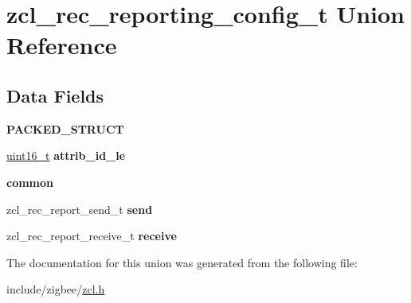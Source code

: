 \hypertarget{unionzcl__rec__reporting__config__t}{}\section{zcl\+\_\+rec\+\_\+reporting\+\_\+config\+\_\+t Union Reference}
\label{unionzcl__rec__reporting__config__t}
\subsection*{Data Fields}
\begin{DoxyCompactItemize}
\item 
{\bfseries P\+A\+C\+K\+E\+D\+\_\+\+S\+T\+R\+U\+CT}
\item 
\hyperlink{group__hal__dos_ga5a8b2dc9e45a9ee81a94ef304fb62505}{uint16\+\_\+t} {\bfseries attrib\+\_\+id\+\_\+le}
\item 
{\bfseries common}
\item 
zcl\+\_\+rec\+\_\+report\+\_\+send\+\_\+t {\bfseries send}
\item 
zcl\+\_\+rec\+\_\+report\+\_\+receive\+\_\+t {\bfseries receive}
\end{DoxyCompactItemize}


The documentation for this union was generated from the following file\+:\begin{DoxyCompactItemize}
\item 
include/zigbee/\hyperlink{zcl_8h}{zcl.\+h}\end{DoxyCompactItemize}
